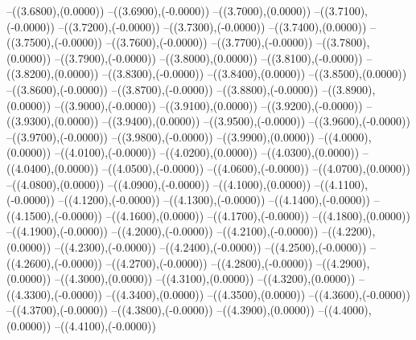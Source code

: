 {	--({\sx*(3.6800)},{\sy*(0.0000)})
	--({\sx*(3.6900)},{\sy*(-0.0000)})
	--({\sx*(3.7000)},{\sy*(0.0000)})
	--({\sx*(3.7100)},{\sy*(-0.0000)})
	--({\sx*(3.7200)},{\sy*(-0.0000)})
	--({\sx*(3.7300)},{\sy*(-0.0000)})
	--({\sx*(3.7400)},{\sy*(0.0000)})
	--({\sx*(3.7500)},{\sy*(-0.0000)})
	--({\sx*(3.7600)},{\sy*(-0.0000)})
	--({\sx*(3.7700)},{\sy*(-0.0000)})
	--({\sx*(3.7800)},{\sy*(0.0000)})
	--({\sx*(3.7900)},{\sy*(-0.0000)})
	--({\sx*(3.8000)},{\sy*(0.0000)})
	--({\sx*(3.8100)},{\sy*(-0.0000)})
	--({\sx*(3.8200)},{\sy*(0.0000)})
	--({\sx*(3.8300)},{\sy*(-0.0000)})
	--({\sx*(3.8400)},{\sy*(0.0000)})
	--({\sx*(3.8500)},{\sy*(0.0000)})
	--({\sx*(3.8600)},{\sy*(-0.0000)})
	--({\sx*(3.8700)},{\sy*(-0.0000)})
	--({\sx*(3.8800)},{\sy*(-0.0000)})
	--({\sx*(3.8900)},{\sy*(0.0000)})
	--({\sx*(3.9000)},{\sy*(-0.0000)})
	--({\sx*(3.9100)},{\sy*(0.0000)})
	--({\sx*(3.9200)},{\sy*(-0.0000)})
	--({\sx*(3.9300)},{\sy*(0.0000)})
	--({\sx*(3.9400)},{\sy*(0.0000)})
	--({\sx*(3.9500)},{\sy*(-0.0000)})
	--({\sx*(3.9600)},{\sy*(-0.0000)})
	--({\sx*(3.9700)},{\sy*(-0.0000)})
	--({\sx*(3.9800)},{\sy*(-0.0000)})
	--({\sx*(3.9900)},{\sy*(0.0000)})
	--({\sx*(4.0000)},{\sy*(0.0000)})
	--({\sx*(4.0100)},{\sy*(-0.0000)})
	--({\sx*(4.0200)},{\sy*(0.0000)})
	--({\sx*(4.0300)},{\sy*(0.0000)})
	--({\sx*(4.0400)},{\sy*(0.0000)})
	--({\sx*(4.0500)},{\sy*(-0.0000)})
	--({\sx*(4.0600)},{\sy*(-0.0000)})
	--({\sx*(4.0700)},{\sy*(0.0000)})
	--({\sx*(4.0800)},{\sy*(0.0000)})
	--({\sx*(4.0900)},{\sy*(-0.0000)})
	--({\sx*(4.1000)},{\sy*(0.0000)})
	--({\sx*(4.1100)},{\sy*(-0.0000)})
	--({\sx*(4.1200)},{\sy*(-0.0000)})
	--({\sx*(4.1300)},{\sy*(-0.0000)})
	--({\sx*(4.1400)},{\sy*(-0.0000)})
	--({\sx*(4.1500)},{\sy*(-0.0000)})
	--({\sx*(4.1600)},{\sy*(0.0000)})
	--({\sx*(4.1700)},{\sy*(-0.0000)})
	--({\sx*(4.1800)},{\sy*(0.0000)})
	--({\sx*(4.1900)},{\sy*(-0.0000)})
	--({\sx*(4.2000)},{\sy*(-0.0000)})
	--({\sx*(4.2100)},{\sy*(-0.0000)})
	--({\sx*(4.2200)},{\sy*(0.0000)})
	--({\sx*(4.2300)},{\sy*(-0.0000)})
	--({\sx*(4.2400)},{\sy*(-0.0000)})
	--({\sx*(4.2500)},{\sy*(-0.0000)})
	--({\sx*(4.2600)},{\sy*(-0.0000)})
	--({\sx*(4.2700)},{\sy*(-0.0000)})
	--({\sx*(4.2800)},{\sy*(-0.0000)})
	--({\sx*(4.2900)},{\sy*(0.0000)})
	--({\sx*(4.3000)},{\sy*(0.0000)})
	--({\sx*(4.3100)},{\sy*(0.0000)})
	--({\sx*(4.3200)},{\sy*(0.0000)})
	--({\sx*(4.3300)},{\sy*(-0.0000)})
	--({\sx*(4.3400)},{\sy*(0.0000)})
	--({\sx*(4.3500)},{\sy*(0.0000)})
	--({\sx*(4.3600)},{\sy*(-0.0000)})
	--({\sx*(4.3700)},{\sy*(-0.0000)})
	--({\sx*(4.3800)},{\sy*(-0.0000)})
	--({\sx*(4.3900)},{\sy*(0.0000)})
	--({\sx*(4.4000)},{\sy*(0.0000)})
	--({\sx*(4.4100)},{\sy*(-0.0000)})
}
